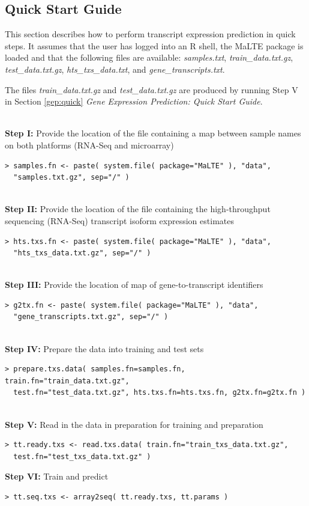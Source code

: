 \documentclass[a4paper,12pt]{article}
\begin{document}
\subsection{Quick Start Guide}
\label{tiep:quick}
This section describes how to perform transcript expression prediction in quick steps. It assumes that the user has logged into an \textsf{R} shell, the \textsf{MaLTE} package is loaded and that the following files are available: \textit{samples.txt}, \textit{train\_data.txt.gz}, \textit{test\_data.txt.gz}, \textit{hts\_txs\_data.txt}, and \textit{gene\_transcripts.txt}.

The files \textit{train\_data.txt.gz} and \textit{test\_data.txt.gz} are produced by running Step V in Section \ref{gep:quick} \textit{Gene Expression Prediction: Quick Start Guide}.

\noindent\\
\textbf{Step I:} Provide the location of the file containing a map between sample names on both platforms (RNA-Seq and microarray)
\begin{verbatim}
> samples.fn <- paste( system.file( package="MaLTE" ), "data", 
  "samples.txt.gz", sep="/" )
\end{verbatim}

\noindent\\
\textbf{Step II:} Provide the location of the file containing the high-throughput sequencing (RNA-Seq) transcript isoform expression estimates
\begin{verbatim}
> hts.txs.fn <- paste( system.file( package="MaLTE" ), "data", 
  "hts_txs_data.txt.gz", sep="/" )
\end{verbatim}

\noindent\\
\textbf{Step III:} Provide the location of map of gene-to-transcript identifiers
\begin{verbatim}
> g2tx.fn <- paste( system.file( package="MaLTE" ), "data", 
  "gene_transcripts.txt.gz", sep="/" )
\end{verbatim}

\noindent\\
\textbf{Step IV:} Prepare the data into training and test sets
\begin{verbatim}
> prepare.txs.data( samples.fn=samples.fn, train.fn="train_data.txt.gz", 
  test.fn="test_data.txt.gz", hts.txs.fn=hts.txs.fn, g2tx.fn=g2tx.fn )
\end{verbatim}

\noindent\\
\textbf{Step V:} Read in the data in preparation for training and preparation
\begin{verbatim}
> tt.ready.txs <- read.txs.data( train.fn="train_txs_data.txt.gz", 
  test.fn="test_txs_data.txt.gz" )
\end{verbatim}
\textbf{Step VI:} Train and predict
\begin{verbatim}
> tt.seq.txs <- array2seq( tt.ready.txs, tt.params )
\end{verbatim}
\end{document}
